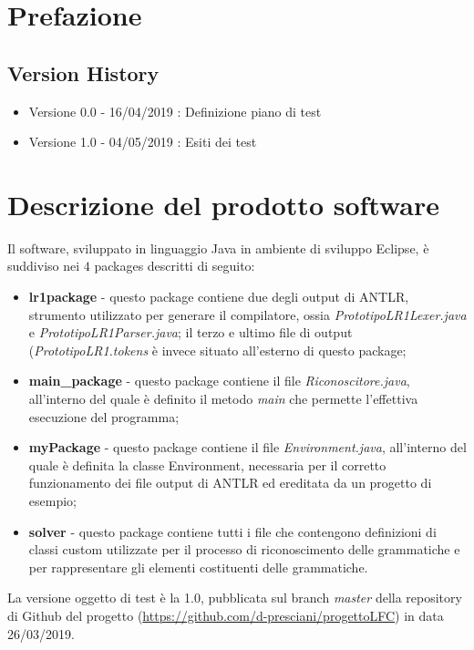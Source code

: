 \documentclass[12pt]{article}
\begin{document}
\tableofcontents

\pagebreak

\section{Prefazione}

\subsection{Version History}

\begin{itemize}
\item Versione 0.0 - 16/04/2019 : Definizione piano di test 
\item Versione 1.0 - 04/05/2019 : Esiti dei test
\end{itemize}

\pagebreak

\section{Descrizione del prodotto software}
Il software, sviluppato in linguaggio Java in ambiente di sviluppo Eclipse, è suddiviso nei $4$ packages descritti di seguito:
\begin{itemize}
\item \textbf{lr1package} - questo package contiene due degli output di ANTLR, strumento utilizzato per generare il compilatore, ossia \textit{PrototipoLR1Lexer.java} e \textit{PrototipoLR1Parser.java}; il terzo e ultimo file di output (\textit{PrototipoLR1.tokens} è invece situato all'esterno di questo package;
\item \textbf{main\_package} - questo package contiene il file \textit{Riconoscitore.java}, all'interno del quale è definito il metodo \textit{main} che permette l'effettiva esecuzione del programma;
\item \textbf{myPackage} - questo package contiene il file \textit{Environment.java}, all'interno del quale è definita la classe Environment, necessaria per il corretto funzionamento dei file output di ANTLR ed ereditata da un progetto di esempio;
\item \textbf{solver} - questo package contiene tutti i file che contengono definizioni di classi custom utilizzate per il processo di riconoscimento delle grammatiche e per rappresentare gli elementi costituenti delle grammatiche.
\end{itemize}
La versione oggetto di test è la 1.0, pubblicata sul branch \textit{master} della repository di Github del progetto (\url{https://github.com/d-presciani/progettoLFC}) in data 26/03/2019.
\pagebreak
\end{document}
